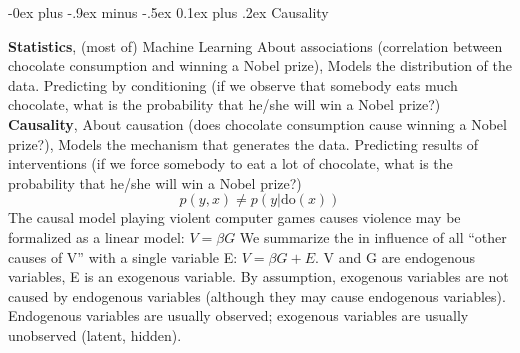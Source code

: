 \documentclass[9pt,landscape]{article}
\makeatletter
\renewcommand{\section}{\@startsection{section}{1}{0mm}%
                                {-0ex plus -.9ex minus -.5ex}%
                                {0.1ex plus .2ex}%
                                {\normalfont\scriptsize\bfseries}}
\makeatother
\begin{document}
\begin{multicols}{3}
\section{Causality}
\begin{scriptsize}
\textbf{Statistics}, (most of) Machine Learning
About associations (correlation between chocolate consumption and
winning a Nobel prize), Models the distribution of the data. Predicting by conditioning (if we observe that somebody eats much
chocolate, what is the probability that he/she will win a Nobel prize?)
\textbf{Causality}, About causation (does chocolate consumption cause winning a Nobel
prize?), Models the mechanism that generates the data. Predicting results of interventions (if we force somebody to eat a lot
of chocolate, what is the probability that he/she will win a Nobel
prize?)
$$p(y,x) \neq p(y|\mathrm{do}(x))$$
The causal model playing violent computer games causes violence
may be formalized as a linear model:
$V = \beta G$
We summarize the in
influence of all ``other causes of V'' with a single variable E: $V = \beta G +E$. V and G are endogenous variables, E is an exogenous variable.
By assumption, exogenous variables are not caused by endogenous
variables (although they may cause endogenous variables).
Endogenous variables are usually observed; exogenous variables are
usually unobserved (latent, hidden).
\end{scriptsize}

\end{multicols}
\end{document}
